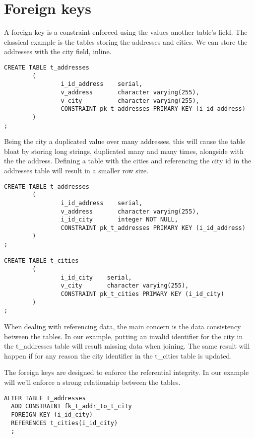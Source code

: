 \section{Foreign keys}
\label{sec:FKEYS}
A foreign key is a constraint enforced using the values another table's field. The classical 
example is the tables storing the addresses  and cities. We can store the addresses with the city 
field, inline.

\begin{lstlisting}[style=pgsql]
CREATE TABLE t_addresses
        (
                i_id_address    serial,
                v_address       character varying(255),
                v_city          character varying(255),
                CONSTRAINT pk_t_addresses PRIMARY KEY (i_id_address)
        )
;
\end{lstlisting}

Being the city a duplicated value over many addresses, this will cause the table bloat by storing 
long strings, duplicated many and many times, alongside with the the address. Defining a table with 
the cities and referencing the city id in the addresses table will result in a smaller row size. 

\begin{lstlisting}[style=pgsql]
CREATE TABLE t_addresses
        (
                i_id_address    serial,
                v_address       character varying(255),
                i_id_city       integer NOT NULL,
                CONSTRAINT pk_t_addresses PRIMARY KEY (i_id_address)
        )
;

CREATE TABLE t_cities
        (
                i_id_city    serial,
                v_city       character varying(255),
                CONSTRAINT pk_t_cities PRIMARY KEY (i_id_city)
        )
;

\end{lstlisting}

When dealing with referencing data, the main concern is the data consistency between the tables. 
In our example, putting an invalid identifier for the city in the t\_addresses table will result 
missing data when joining. The same result will happen if for any reason the city identifier in 
the t\_cities table is updated.\newline

The foreign keys are designed to enforce the referential integrity. In our example will we'll 
enforce a strong relationship between the tables.

\begin{lstlisting}[style=pgsql]
ALTER TABLE t_addresses 
  ADD CONSTRAINT fk_t_addr_to_t_city
  FOREIGN KEY (i_id_city)
  REFERENCES t_cities(i_id_city)
  ;

\end{lstlisting}

